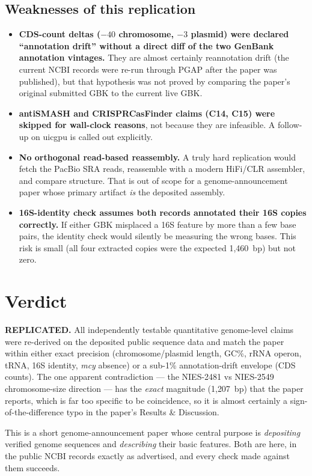 \documentclass[11pt,letterpaper]{article}
\begin{document}
\subsection{Weaknesses of this replication}
\begin{itemize}[leftmargin=1.4em]
  \item \textbf{CDS-count deltas ($-40$ chromosome, $-3$ plasmid) were declared ``annotation drift'' without a direct diff of the two GenBank annotation vintages.} They are almost certainly reannotation drift (the current NCBI records were re-run through PGAP after the paper was published), but that hypothesis was not proved by comparing the paper's original submitted GBK to the current live GBK.
  \item \textbf{antiSMASH and CRISPRCasFinder claims (C14, C15) were skipped for wall-clock reasons}, not because they are infeasible. A follow-up on uicgpu is called out explicitly.
  \item \textbf{No orthogonal read-based reassembly.} A truly hard replication would fetch the PacBio SRA reads, reassemble with a modern HiFi/CLR assembler, and compare structure. That is out of scope for a genome-announcement paper whose primary artifact \emph{is} the deposited assembly.
  \item \textbf{16S-identity check assumes both records annotated their 16S copies correctly.} If either GBK misplaced a 16S feature by more than a few base pairs, the identity check would silently be measuring the wrong bases. This risk is small (all four extracted copies were the expected 1{,}460~bp) but not zero.
\end{itemize}

\section{Verdict}
\textbf{REPLICATED.} All independently testable quantitative genome-level claims were re-derived on the deposited public sequence data and match the paper within either exact precision (chromosome/plasmid length, GC\%, rRNA operon, tRNA, 16S identity, \emph{mcy} absence) or a sub-1\% annotation-drift envelope (CDS counts). The one apparent contradiction --- the NIES-2481 vs NIES-2549 chromosome-size direction --- has the \emph{exact} magnitude (1{,}207~bp) that the paper reports, which is far too specific to be coincidence, so it is almost certainly a sign-of-the-difference typo in the paper's Results \& Discussion.

This is a short genome-announcement paper whose central purpose is \emph{depositing} verified genome sequences and \emph{describing} their basic features. Both are here, in the public NCBI records exactly as advertised, and every check made against them succeeds.
\end{document}
